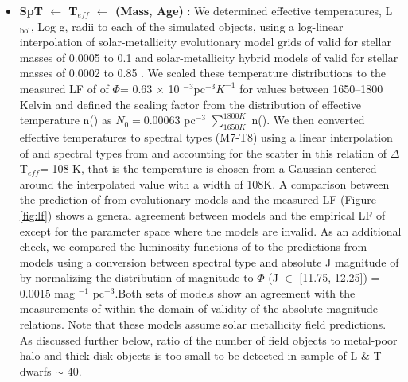 \documentclass[manuscript]{aastex63}
\begin{document}
\begin{itemize}
\item \textbf{SpT $\leftarrow$ T$_{eff}$  $\leftarrow$ (Mass, Age) }: We determined effective temperatures, L$_{\text{bol}}$, Log g, radii to each of the simulated objects, using a log-linear interpolation of solar-metallicity evolutionary model grids of \cite{2003A&A...402..701B} valid for stellar masses of 0.0005 to 0.1 \Msun and solar-metallicity hybrid models of \cite{2008ApJ...689.1327S} valid for stellar masses of 0.0002 to 0.85 \Msun. We scaled these temperature distributions to the measured LF of \cite{2019ApJS..240...19K} of $\Phi$= 0.63 $\times$ 10 $^{-3}$pc$^{-3} K^{-1}$ for \teff values between 1650--1800 Kelvin and defined the scaling factor from the distribution of effective temperature n(\teff) as $N_0= 0.00063$ pc$^{-3}$ $\sum_{1650 K} ^ {1800 K}$ n(\teff). We then converted effective temperatures to spectral types (M7-T8) using a linear interpolation of \teff and spectral types from \cite{Pecaut2013} and accounting for the scatter in this relation of $\Delta$ T$_{eff}$= 108 K, that is the temperature is chosen from a Gaussian centered around the interpolated value with a width of 108K. A comparison between the prediction of from evolutionary models and the measured LF (Figure \ref{fig:lf}) shows a general agreement between models and the empirical LF of \cite{2019ApJS..240...19K} except for the parameter space where the models are invalid. As an additional check, we compared the luminosity functions of \cite{2019arXiv190604166B,2007astro.ph..2034C} to the predictions from models using a conversion between spectral type and absolute J magnitude of \cite{2012ApJS..201...19D} by normalizing the distribution of magnitude to $\Phi$ (J $\in$ [11.75, 12.25]) = 0.0015 mag $^{-1}$ pc$^{-3}$.Both sets of models show an agreement with the measurements of \cite{2019arXiv190604166B} within the domain of validity of the absolute-magnitude relations. Note that these models assume solar metallicity field predictions. As discussed further below, ratio of the number of field objects to metal-poor halo and thick disk objects is too small to be detected in sample of L \& T dwarfs $\sim$ 40.

\end{itemize}
\end{document}
